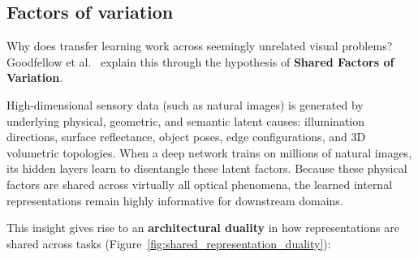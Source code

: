 \subsection{Factors of variation}
\label{sec:factors_of_variation_dualities}

Why does transfer learning work across seemingly unrelated visual problems? Goodfellow et al.~\cite{goodfellow2016deep} explain this through the hypothesis of \textbf{Shared Factors of Variation}. 

High-dimensional sensory data (such as natural images) is generated by underlying physical, geometric, and semantic latent causes: illumination directions, surface reflectance, object poses, edge configurations, and 3D volumetric topologies. When a deep network trains on millions of natural images, its hidden layers learn to disentangle these latent factors. Because these physical factors are shared across virtually all optical phenomena, the learned internal representations remain highly informative for downstream domains.

This insight gives rise to an \textbf{architectural duality} in how representations are shared across tasks (Figure~\ref{fig:shared_representation_duality}):

